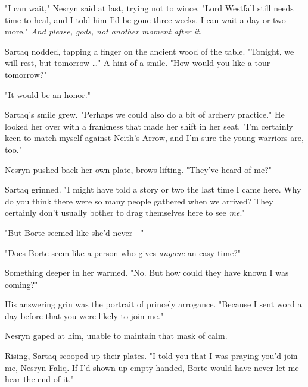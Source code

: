 "I can wait," Nesryn said at last, trying not to wince.
"Lord Westfall still needs time to heal, and I told him I'd be gone three weeks.
I can wait a day or two more."
\emph{And please, gods, not another moment after it.}

Sartaq nodded, tapping a finger on the ancient wood of the table.
"Tonight, we will rest, but tomorrow \ldots" A hint of a smile.
"How would you like a tour tomorrow?"

"It would be an honor."

Sartaq's smile grew.
"Perhaps we could also do a bit of archery practice."
He looked her over with a frankness that made her shift in her seat.
"I'm certainly keen to match myself against Neith's Arrow, and I'm sure the young warriors are, too."

Nesryn pushed back her own plate, brows lifting.
"They've heard of me?"

Sartaq grinned.
"I might have told a story or two the last time I came here.
Why do you think there were so many people gathered when we arrived?
They certainly don't usually bother to drag themselves here to see \emph{me}."

"But Borte seemed like she'd never---"

"Does Borte seem like a person who gives \emph{anyone} an easy time?"

Something deeper in her warmed.
"No.
But how could they have known I was coming?"

His answering grin was the portrait of princely arrogance.
"Because I sent word a day before that you were likely to join me."

Nesryn gaped at him, unable to maintain that mask of calm.

Rising, Sartaq scooped up their plates.
"I told you that I was praying you'd join me, Nesryn Faliq.
If I'd shown up empty-handed, Borte would have never let me hear the end of it."

